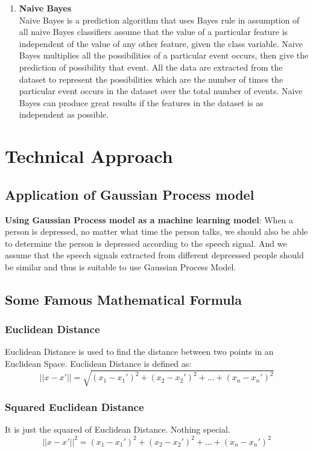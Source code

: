 \documentclass{article}
\begin{document}
\begin{enumerate}
		\item \textbf{Naive Bayes} \\ 
		Naive Bayes is a prediction algorithm that uses Bayes rule in assumption of all naive Bayes classifiers assume that the value of a particular feature is 
		independent of the value of any other feature, given the class variable. Naive Bayes multiplies all the possibilities of a particular event occurs, then 
		give the prediction of possibility that event. All the data are extracted from the dataset to represent the possibilities which are the number of times 
		the particular event occurs in the dataset over the total number of events. Naive Bayes can produce great results if the features in the dataset is as 
		independent as possible. 
	\end{enumerate}

	\section{Technical Approach}
	\subsection{Application of Gaussian Process model}
	
	\textbf{Using Gaussian Process model as a machine learning model}: 
	When a person is depressed, no matter what time the person talks, we should also be able to determine the person is depressed according 
	to the speech signal. And we assume that the speech signals extracted from different depreessed people should be similar and thus is suitable 
	to use Gaussian Process Model.

	\subsection{Some Famous Mathematical Formula}
	\subsubsection{Euclidean Distance}
	Euclidean Distance is used to find the distance between two points in an Euclidean Space. Euclidean Distance is defined as:
	\begin{equation}\label{eq:eucdis}
		||x-x'|| = \sqrt{(x_{1} - {x_{1}}')^{2} + (x_{2} - {x_{2}}')^{2} + ... + (x_{n} - {x_{n}}')^{2}}  
	\end{equation}

	\subsubsection{Squared Euclidean Distance}
	It is just the squared of Euclidean Distance. Nothing special.
	\begin{equation}\label{eq:sq_eucdis}
		||x-x'||^{2} = (x_{1} - {x_{1}}')^{2} + (x_{2} - {x_{2}}')^{2} + ... + (x_{n} - {x_{n}}')^{2}  
	\end{equation}
\end{document}
